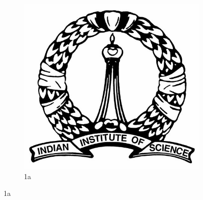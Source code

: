 \documentclass[10pt,a4paper]{article}
\begin{document}
\begin{figure}
    \begin{subfigure}{.30\textwidth}
        \centering
        \includegraphics[width=1.0\linewidth]{IISc_logo.jpg}
        \caption{1a}
        \label{fig:sfig1}
    \end{subfigure}


\end{figure}
\end{document}
